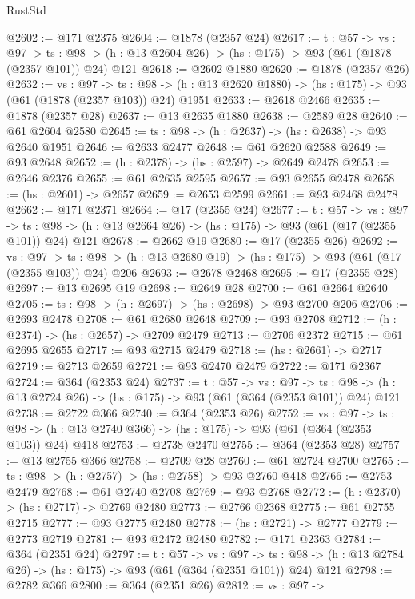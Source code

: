 \begin{lexlean}{RustStd}
\begin{coremodule}
{\begin{coremodule}
{{{{{{@2602 := @171 @2375
@2604 := @1878 (@2357 @24)
@2617 := {t : @57} ->
  {vs : @97} ->
  {ts : @98} -> (h : @13 @2604 @26) -> (hs : @175) -> @93 (@61 (@1878 (@2357 @101)) @24) @121
@2618 := @2602 @1880
@2620 := @1878 (@2357 @26)
@2632 := {vs : @97} ->
  {ts : @98} -> (h : @13 @2620 @1880) -> (hs : @175) -> @93 (@61 (@1878 (@2357 @103)) @24) @1951
@2633 := @2618 @2466
@2635 := @1878 (@2357 @28)
@2637 := @13 @2635 @1880
@2638 := @2589 @28
@2640 := @61 @2604 @2580
@2645 := {ts : @98} -> (h : @2637) -> (hs : @2638) -> @93 @2640 @1951
@2646 := @2633 @2477
@2648 := @61 @2620 @2588
@2649 := @93 @2648
@2652 := (h : @2378) -> (hs : @2597) -> @2649 @2478
@2653 := @2646 @2376
@2655 := @61 @2635 @2595
@2657 := @93 @2655 @2478
@2658 := (hs : @2601) -> @2657
@2659 := @2653 @2599
@2661 := @93 @2468 @2478
@2662 := @171 @2371
@2664 := @17 (@2355 @24)
@2677 := {t : @57} ->
  {vs : @97} ->
  {ts : @98} -> (h : @13 @2664 @26) -> (hs : @175) -> @93 (@61 (@17 (@2355 @101)) @24) @121
@2678 := @2662 @19
@2680 := @17 (@2355 @26)
@2692 := {vs : @97} ->
  {ts : @98} -> (h : @13 @2680 @19) -> (hs : @175) -> @93 (@61 (@17 (@2355 @103)) @24) @206
@2693 := @2678 @2468
@2695 := @17 (@2355 @28)
@2697 := @13 @2695 @19
@2698 := @2649 @28
@2700 := @61 @2664 @2640
@2705 := {ts : @98} -> (h : @2697) -> (hs : @2698) -> @93 @2700 @206
@2706 := @2693 @2478
@2708 := @61 @2680 @2648
@2709 := @93 @2708
@2712 := (h : @2374) -> (hs : @2657) -> @2709 @2479
@2713 := @2706 @2372
@2715 := @61 @2695 @2655
@2717 := @93 @2715 @2479
@2718 := (hs : @2661) -> @2717
@2719 := @2713 @2659
@2721 := @93 @2470 @2479
@2722 := @171 @2367
@2724 := @364 (@2353 @24)
@2737 := {t : @57} ->
  {vs : @97} ->
  {ts : @98} -> (h : @13 @2724 @26) -> (hs : @175) -> @93 (@61 (@364 (@2353 @101)) @24) @121
@2738 := @2722 @366
@2740 := @364 (@2353 @26)
@2752 := {vs : @97} ->
  {ts : @98} -> (h : @13 @2740 @366) -> (hs : @175) -> @93 (@61 (@364 (@2353 @103)) @24) @418
@2753 := @2738 @2470
@2755 := @364 (@2353 @28)
@2757 := @13 @2755 @366
@2758 := @2709 @28
@2760 := @61 @2724 @2700
@2765 := {ts : @98} -> (h : @2757) -> (hs : @2758) -> @93 @2760 @418
@2766 := @2753 @2479
@2768 := @61 @2740 @2708
@2769 := @93 @2768
@2772 := (h : @2370) -> (hs : @2717) -> @2769 @2480
@2773 := @2766 @2368
@2775 := @61 @2755 @2715
@2777 := @93 @2775 @2480
@2778 := (hs : @2721) -> @2777
@2779 := @2773 @2719
@2781 := @93 @2472 @2480
@2782 := @171 @2363
@2784 := @364 (@2351 @24)
@2797 := {t : @57} ->
  {vs : @97} ->
  {ts : @98} -> (h : @13 @2784 @26) -> (hs : @175) -> @93 (@61 (@364 (@2351 @101)) @24) @121
@2798 := @2782 @366
@2800 := @364 (@2351 @26)
@2812 := {vs : @97} ->
}}}}}}
\end{coremodule}}
\end{coremodule}
\end{lexlean}
